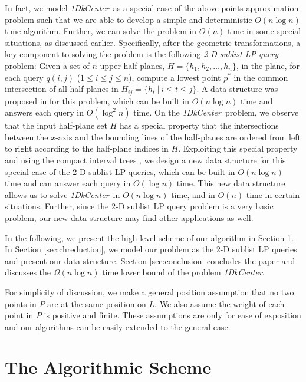 \documentclass{llncs}
\def\problem{{\it 1DkCenter}}
\begin{document}
In fact, we model \problem\ as a special case of the above points approximation problem such that we are able to develop a simple and deterministic $O(n\log n)$ time algorithm. Further, we can solve the problem in $O(n)$ time in some special situations, as discussed earlier.
Specifically, after the
geometric transformations, a key component to solving the problem is
the following {\em 2-D
sublist LP query} problem: Given a set of $n$ upper half-planes,
$H=\{h_1,h_2,\ldots,h_n\}$, in the plane, for each query $q(i,j)$
($1\leq i\leq j\leq n$), compute a lowest point $p^*$ in the common
intersection of all half-planes in $H_{ij}=\{h_t \ | \ i\leq t\leq
j\}$. A data structure was proposed in \cite{ref:ChenAp091} for this
problem, which can be built in $O(n\log n)$ time and answers each
query in $O(\log^2 n)$ time.
On the \problem\ problem, we observe that the input half-plane
set $H$ has a special property that the intersections between the
$x$-axis and the bounding lines of the half-planes are
ordered from left to right according to the half-plane indices in $H$. Exploiting
this special property and using the compact
interval trees \cite{ref:GuibasCo91},
we design a new data structure for this special case of the 2-D
sublist LP queries, which can be built in
$O(n\log n)$ time and can answer each query in $O(\log n)$
time. This new data structure allows us to solve \problem\ in
$O(n\log n)$ time, and in $O(n)$ time in certain situations.
Further, since the 2-D sublist LP query problem
is a very basic problem, our new data structure may find other applications as
well.





In the following, we present the high-level scheme of our algorithm
in Section \ref{sec:algorithms}. In Section
\ref{sec:chreduction}, we model our problem as the
2-D sublist LP queries and present our data structure.
Section \ref{sec:conclusion} concludes the
paper and discusses the $\Omega(n\log n)$ time lower bound of the problem \problem.


For simplicity of discussion, we make a general position assumption that no two
points in $P$ are at the same position on $L$. We also assume the
weight of each point in $P$ is positive and finite. These
assumptions are only for ease of exposition and our algorithms can
be easily extended to the general case.

\section{The Algorithmic Scheme}
\label{sec:algorithms}
\end{document}
